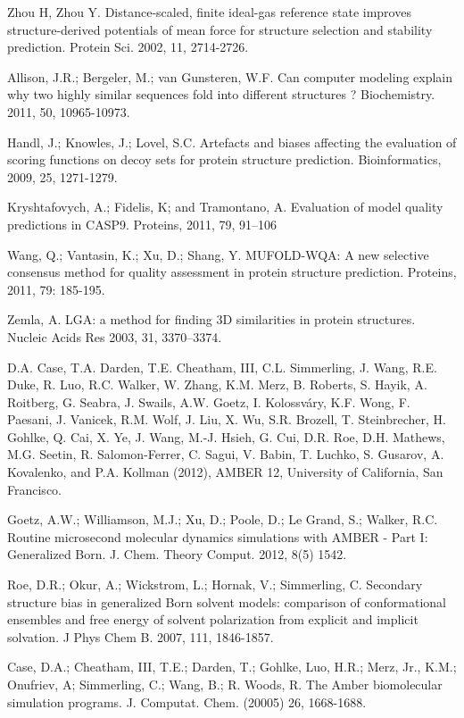 \documentclass[12pt]{article}
\begin{document}
\begin{thebibliography}{99}
Zhou H, Zhou Y. Distance-scaled, finite ideal-gas reference state improves structure-derived potentials of mean force for structure selection and
stability prediction. Protein Sci. 2002, 11, 2714-2726.

Allison, J.R.; Bergeler, M.; van Gunsteren, W.F. Can computer modeling explain why two highly similar sequences fold into different structures ?
Biochemistry. 2011, 50, 10965-10973. 

Handl, J.; Knowles, J.; Lovel, S.C. Artefacts and biases affecting the evaluation of scoring
functions on decoy sets for protein structure prediction. Bioinformatics, 2009, 25, 1271-1279.

Kryshtafovych, A.; Fidelis, K; and Tramontano, A. Evaluation of model quality predictions in CASP9. Proteins, 2011, 79, 91–106

Wang, Q.; Vantasin, K.; Xu, D.; Shang, Y. MUFOLD-WQA: A new selective consensus method for quality assessment in protein structure prediction.
Proteins, 2011, 79: 185-195.

Zemla, A. LGA: a method for finding 3D similarities in protein structures. Nucleic Acids Res 2003, 31, 3370–3374.

D.A. Case, T.A. Darden, T.E. Cheatham, III, C.L. Simmerling, J. Wang, R.E. Duke, R. Luo, R.C. Walker, W. Zhang, K.M. Merz, B. Roberts, S. Hayik, A. Roitberg, G. Seabra, J. Swails, A.W. Goetz, I. Kolossváry, K.F. Wong, F. Paesani, J. Vanicek, R.M. Wolf, J. Liu, X. Wu, S.R. Brozell, T. Steinbrecher, H. Gohlke, Q. Cai, X. Ye, J. Wang, M.-J. Hsieh, G. Cui, D.R. Roe, D.H. Mathews, M.G. Seetin, R. Salomon-Ferrer, C. Sagui, V. Babin, T. Luchko, S. Gusarov, A. Kovalenko, and P.A. Kollman (2012), AMBER 12, University of California, San Francisco.

Goetz, A.W.; Williamson, M.J.; Xu, D.; Poole, D.; Le Grand, S.; Walker, R.C. Routine microsecond molecular dynamics simulations with AMBER - Part I: Generalized
Born. J. Chem. Theory Comput. 2012, 8(5) 1542.

Roe, D.R.; Okur, A.; Wickstrom, L.; Hornak, V.; Simmerling, C. Secondary structure bias in generalized Born solvent models: comparison of conformational ensembles 
and free energy of solvent polarization from explicit and implicit solvation. J Phys Chem B. 2007, 111, 1846-1857.

Case, D.A.; Cheatham, III, T.E.; Darden, T.; Gohlke, Luo, H.R.; Merz, Jr., K.M.;  Onufriev, A; Simmerling, C.;
Wang, B.; R. Woods, R. The Amber biomolecular simulation programs. J. Computat. Chem. (20005) 26, 1668-1688.


\end{thebibliography}
\end{document}
